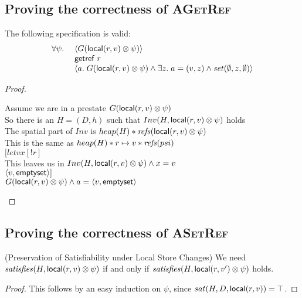 \subsection{Proving the correctness of \textsc{AGetRef}}
\begin{prop*}
The following specification is valid: 
\begin{displaymath}
\begin{array}{ll}
    \forall \psi.\; 
    &  \left<G(\mathsf{local}({r}, {v}) \otimes \psi)\right> \\
    &  \mathsf{getref}\; r \\
    &  \left<a.\; G(\mathsf{local}({r}, {v}) \otimes \psi) 
                  \land  \exists z.\;a = (v,z) \land \mathit{set}(\emptyset, z, \emptyset)
       \right> \\
     \end{array}
\end{displaymath}
\end{prop*}
\begin{proof}
\begin{tabbedproof}
\oo Assume we are in a prestate $G(\mathsf{local}({r}, {v}) \otimes \psi)$ \\
\oo So there is an $H = (D,h)$ such that $Inv(H, \mathsf{local}({r}, {v}) \otimes \psi)$ holds \\
\oo The spatial part of $Inv$ is $heap(H) * \mathit{refs}(\mathsf{local}({r}, {v}) \otimes \psi)$ \\
\oo This is the same as $heap(H) * {r}\mapsto{v} * \mathit{refs}(psi)$ \\
\oo $[letv{x}{[!r]}{}$ \\
\oo This leaves us in $Inv(H, \mathsf{local}({r}, {v}) \otimes \psi) \land x = v$ \\
\oo $\left<{v},{\mathsf{emptyset}}\right>]$ \\
\oo $G(\mathsf{local}({r}, {v}) \otimes \psi) \land a = \left<{v},{\mathsf{emptyset}}\right>$ \\
\end{tabbedproof}
\end{proof}

\subsection{Proving the correctness of \textsc{ASetRef}}

\begin{lemma}{(Preservation of Satisfiability under Local Store Changes)}
We need $\mathit{satisfies}({H}, {\mathsf{local}({r}, {v}) \otimes \psi})$ if and only if $\mathit{satisfies}({H}, {\mathsf{local}({r}, {v'}) \otimes \psi})$ holds.
\end{lemma}
\begin{proof}
This follows by an easy induction on $\psi$, since $sat(H, D, \mathsf{local}({r}, {v})) = \top$. 
\end{proof}

